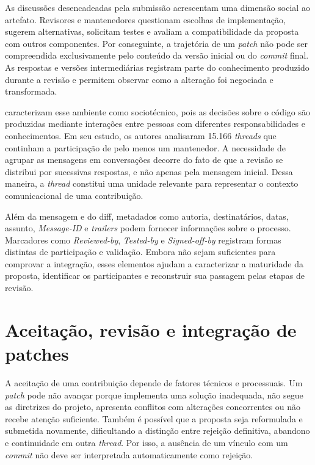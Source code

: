 As discussões desencadeadas pela submissão acrescentam uma dimensão social ao artefato. Revisores e mantenedores questionam escolhas de implementação, sugerem alternativas, solicitam testes e avaliam a compatibilidade da proposta com outros componentes. Por conseguinte, a trajetória de um \textit{patch} não pode ser compreendida exclusivamente pelo conteúdo da versão inicial ou do \textit{commit} final. As respostas e versões intermediárias registram parte do conhecimento produzido durante a revisão e permitem observar como a alteração foi negociada e transformada.

\cite{ferreira2019maintainers} caracterizam esse ambiente como sociotécnico, pois as decisões sobre o código são produzidas mediante interações entre pessoas com diferentes responsabilidades e conhecimentos. Em seu estudo, os autores analisaram 15.166 \textit{threads} que continham a participação de pelo menos um mantenedor. A necessidade de agrupar as mensagens em conversações decorre do fato de que a revisão se distribui por sucessivas respostas, e não apenas pela mensagem inicial. Dessa maneira, a \textit{thread} constitui uma unidade relevante para representar o contexto comunicacional de uma contribuição. 

Além da mensagem e do diff, metadados como autoria, destinatários, datas, assunto, \textit{Message-ID} e \textit{trailers} podem fornecer informações sobre o processo. Marcadores como \textit{Reviewed-by}, \textit{Tested-by} e \textit{Signed-off-by} registram formas distintas de participação e validação. Embora não sejam suficientes para comprovar a integração, esses elementos ajudam a caracterizar a maturidade da proposta, identificar os participantes e reconstruir sua passagem pelas etapas de revisão.

\section{Aceitação, revisão e integração de patches}

A aceitação de uma contribuição depende de fatores técnicos e processuais. Um \textit{patch} pode não avançar porque implementa uma solução inadequada, não segue as diretrizes do projeto, apresenta conflitos com alterações concorrentes ou não recebe atenção suficiente. Também é possível que a proposta seja reformulada e submetida novamente, dificultando a distinção entre rejeição definitiva, abandono e continuidade em outra \textit{thread}. Por isso, a ausência de um vínculo com um \textit{commit} não deve ser interpretada automaticamente como rejeição.

